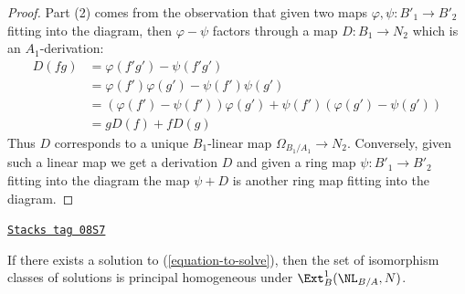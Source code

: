 \begin{proof}
\medskip\noindent
Part (2) comes from the observation that given two maps
$\varphi, \psi : B'_1 \to B'_2$ fitting into the diagram, then
$\varphi - \psi$ factors through a map $D : B_1 \to N_2$ which
is an $A_1$-derivation:
\begin{align*}
D(fg) & = \varphi(f'g') - \psi(f'g') \\
& =
\varphi(f')\varphi(g') - \psi(f')\psi(g') \\
& =
(\varphi(f') - \psi(f'))\varphi(g') + \psi(f')(\varphi(g') - \psi(g')) \\
& =
gD(f) + fD(g)
\end{align*}
Thus $D$ corresponds to a unique $B_1$-linear map
$\Omega_{B_1/A_1} \to N_2$. Conversely, given such a linear map
we get a derivation $D$ and given a ring map $\psi : B'_1 \to B'_2$
fitting into the diagram
the map $\psi + D$ is another ring map fitting into the diagram.
\end{proof}

\begin{lemma}[Choices]
\label{defos-lemma-choices}
\href{https://stacks.math.columbia.edu/tag/08S7}{\texttt{Stacks tag 08S7}}

If there exists a solution to (\ref{equation-to-solve}), then the set of
isomorphism classes of solutions is principal homogeneous under
$\Ext^1_B(\NL_{B/A}, N)$.
\end{lemma}

